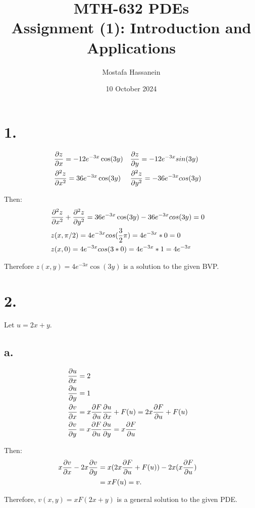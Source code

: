 \documentclass{article}
\author{Mostafa Hassanein}
\title{
  MTH-632 PDEs \\
  Assignment (1): Introduction and Applications}
\date{10 October 2024}
\begin{document}
\maketitle
\newpage

\section*{1.}

\begin{align*}
  &\pdv{z}{x} = -12e^{-3x} \cos(3y) & &\pdv{z}{y} = -12e^{-3x}sin(3y) &&\\
  &\pdv[order=2]{z}{x} = 36e^{-3x} \cos(3y) & &\pdv[order=2]{z}{y} = -36e^{-3x}cos(3y) &&\\
\end{align*}

Then:
\begin{align*}
  &\pdv[order=2]{z}{x} + \pdv[order=2]{z}{y} = 36e^{-3x} \cos(3y) - 36e^{-3x}cos(3y) = 0 &&\\
  &z(x, \pi/2) = 4e^{-3x} cos(\frac{3}{2}\pi) = 4e^{-3x} * 0 = 0 &&\\
  &z(x,0) = 4e^{-3x}cos(3*0) = 4e^{-3x} * 1 = 4e^{-3x}
\end{align*}

Therefore $z(x,y) = 4e^{-3x}\cos(3y)$ is a solution to the given BVP.

\section*{2.}
Let $u = 2x + y$.

\subsection*{a.}
\begin{align*}
  & \pdv{u}{x} = 2 &&\\
  & \pdv{u}{y} = 1 &&\\
  & \pdv{v}{x} = x \pdv{F}{u} \pdv{u}{x} + F(u) = 2x\pdv{F}{u} + F(u) &&\\
  & \pdv{v}{y} = x \pdv{F}{u} \pdv{u}{y} = x \pdv{F}{u} &&\\
\end{align*}

Then:
\begin{align*}
  x\pdv{v}{x} - 2x\pdv{v}{y} &= x (2x \pdv{F}{u} + F(u)) - 2x (x \pdv{F}{u}) &&\\
  &= xF(u) = v.
\end{align*}

Therefore, $v(x, y) = xF(2x + y)$ is a general solution to the given PDE.
\end{document}
